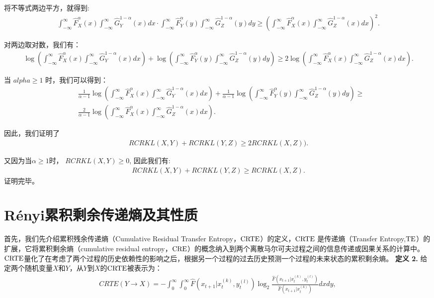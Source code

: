 将不等式两边平方，就得到:
\begin{align*}\
\int_{-\infty}^{\infty} \hat F_{X}^{\alpha}(x) \int_{-\infty}^{\infty} \hat G_{Y}^{1-\alpha}(x)dx \cdot \int_{-\infty}^{\infty} \hat F_{Y}^{\alpha}(y) \int_{-\infty}^{\infty} \hat G_{Z}^{1-\alpha}(y)dy \ge  (\int_{-\infty}^{\infty} \hat F_{X}^{\alpha}(x) \int_{-\infty}^{\infty} \hat G_{Z}^{1-\alpha}(x)dx)^{2}.
\end{align*}

对两边取对数，我们有：
\begin{align*}\
\log(\int_{-\infty}^{\infty} \hat F_{X}^{\alpha}(x) \int_{-\infty}^{\infty} \hat G_{Y}^{1-\alpha}(x)dx)+ \log(\int_{-\infty}^{\infty} \hat F_{Y}^{\alpha}(y) \int_{-\infty}^{\infty} \hat G_{Z}^{1-\alpha}(y)dy) \ge 2\log (\int_{-\infty}^{\infty} \hat F_{X}^{\alpha}(x) \int_{-\infty}^{\infty} \hat G_{Z}^{1-\alpha}(x)dx).
\end{align*}

当 $alpha \ge 1$ 时，我们可以得到：
\begin{align*}\
&\frac{1}{\alpha-1}\log(\int_{-\infty}^{\infty} \hat F_{X}^{\alpha}(x) \int_{-\infty}^{\infty} \hat G_{Y}^{1-\alpha}(x)dx)+ \frac{1}{\alpha-1}\log(\int_{-\infty}^{\infty} \hat F_{Y}^{\alpha}(y) \int_{-\infty}^{\infty} \hat G_{Z}^{1-\alpha}(y)dy) \ge\\
& \frac{2}{\alpha-1}\log (\int_{-\infty}^{\infty} \hat F_{X}^{\alpha}(x) \int_{-\infty}^{\infty} \hat G_{Z}^{1-\alpha}(x)dx).
\end{align*}

因此，我们证明了
\begin{align*}\
RCRKL(X,Y) +RCRKL(Y,Z) \ge 2 RCRKL(X, Z)).
\end{align*}

又因为当$\alpha \ge 1$时， $RCRKL(X,Y) \ge 0$, 因此我们有:
\begin{align*}\
RCRKL(X,Y) +RCRKL(Y,Z) \ge  RCRKL(X, Z).
\end{align*}
证明完毕。\\

\section{R\'{e}nyi累积剩余传递熵及其性质}
首先，我们先介绍累积残余传递熵（Cumulative Residual Transfer Entropy，$\rm{CRTE}$）的定义，$\rm{CRTE}$ 是传递熵（Transfer Entropy,$\rm{TE}$）的扩展，它将累积剩余熵（cumulative residual entropy，$\rm{CRE}$）的概念纳入到两个离散马尔可夫过程之间的信息传递或因果关系的计算中。$\rm{CRTE}$量化了在考虑了两个过程的历史依赖性的影响之后，根据另一个过程的过去历史预测一个过程的未来状态的累积剩余熵。
\textbf{定义 2.} 给定两个随机变量$X$和$Y$，从$Y$到$X$的$\rm{CRTE}$被表示为：
\begin{align}\label{CRTE}
CRTE(Y \rightarrow X) = -\int_{0}^{\infty} \int_{0}^{\infty} \hat{F}(x_{t+1}|x_t^{(k)}, y_{t}^{(l)}) \log_{2} \frac{\hat{F}(x_{t+1}|x_t^{(k)}, y_{t}^{(l)})}{\hat{F}(x_{t+1}|x_{t}^{(k)})}  dx dy,
\end{align}

